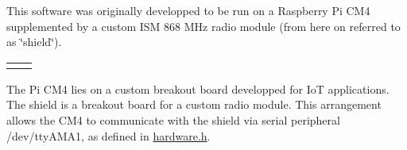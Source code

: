 This software was originally developped to be run on a Raspberry Pi CM4 supplemented by a custom ISM 868 MHz radio module (from here on referred to as \char`\"{}shield\char`\"{}). \tabulinesep=1mm
\begin{longtabu}spread 0pt [c]{*{2}{|X[-1]}|}
\hline
 & \\
\end{longtabu}
The Pi CM4 lies on a custom breakout board developped for IoT applications. The shield is a breakout board for a custom radio module. This arrangement allows the CM4 to communicate with the shield via serial peripheral /dev/tty\+AMA1, as defined in \mbox{\hyperlink{hardware_8h}{hardware.\+h}}. 